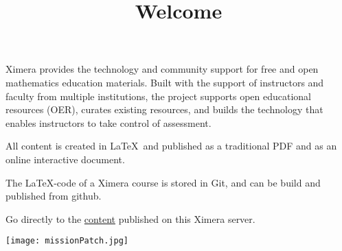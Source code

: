 \documentclass{ximera}
\title{Welcome}
\begin{document}
\begin{abstract}
\end{abstract}
\maketitle

Ximera provides the technology and community support for free and open mathematics education materials. Built with the support of instructors and faculty from multiple institutions, the project supports open educational resources (OER), curates existing resources, and builds the technology that enables instructors to take control of assessment.


All content is created in \LaTeX\  and published as a traditional PDF and as an online interactive document. 

The \LaTeX-code of a Ximera course is stored in Git, and can be build and published from github.


\begin{remark}
Go directly to the \href{/repositories}{content} published on this Ximera server.
\end{remark}


\begin{image}[0.5\textwidth] %
    \texttt{[image: missionPatch.jpg]}  %
\end{image}
\end{document}
